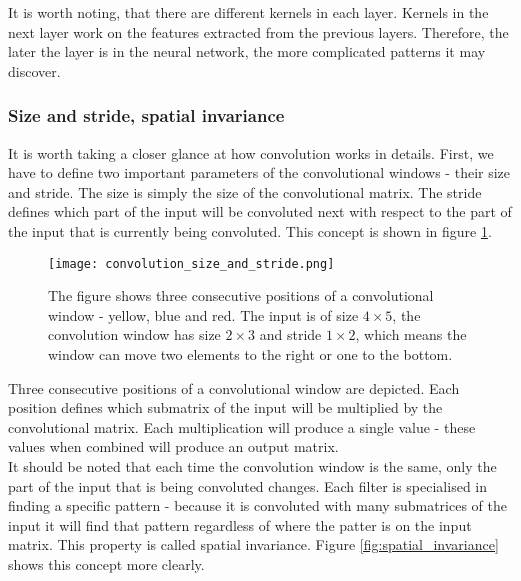\documentclass[a4paper,10pt]{report}
\begin{document}
	  It is worth noting, that there are different kernels in each layer. Kernels in the next layer work on the features extracted from the previous layers. Therefore, the later the layer is in the neural network, the more complicated patterns it may discover.\\
	  
	  \subsubsection{Size and stride, spatial invariance}
	  
	  It is worth taking a closer glance at how convolution works in details. First, we have to define two important parameters of the convolutional windows - their size and stride. The size is simply the size of the convolutional matrix. The stride defines which part of the input will be convoluted next with respect to the part of the input that is currently being convoluted. This concept is shown in figure \ref{fig:convolution_size_and_stride}.\\
	  
	  
	  \begin{figure}[h!]
	    \centering
	    \texttt{[image: convolution\_size\_and\_stride.png]}
	    \caption{The figure shows three consecutive positions of a convolutional window - yellow, blue and red. The input is of size $4\times5$, the convolution window has size $2\times3$ and stride $1\times2$, which means the window can move two elements to the right or one to the bottom.}
	    \label{fig:convolution_size_and_stride}
	  \end{figure} 
	  
	  Three consecutive positions of a convolutional window are depicted. Each position defines which submatrix of the input will be multiplied by the convolutional matrix. Each multiplication will produce a single value - these values when combined will produce an output matrix.\\
	  
	  It should be noted that each time the convolution window is the same, only the part of the input that is being convoluted changes. Each filter is specialised in finding a specific pattern - because it is convoluted with many submatrices of the input it will find that pattern regardless of where the patter is on the input matrix. This property is called spatial invariance. Figure \ref{fig:spatial_invariance} shows this concept more clearly.\\
	  	  
\end{document}
